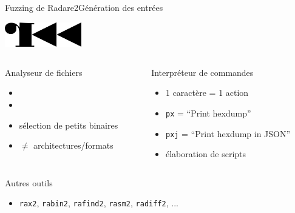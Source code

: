 \begin{frame}[fragile]{Fuzzing de Radare2}{Génération des entrées}
  \begin{center}
    \includegraphics[width=0.25\textwidth, clip=true]{../medias/radare2-logo.png}
  \end{center}

  \begin{columns}[T]
    \begin{column}{0.44\linewidth}

      \begin{block}{Analyseur de fichiers}
        \begin{itemize}
        \item{}
        \item{}
        \item{sélection de petits binaires}
        \item{$\ne$ architectures/formats}
        \end{itemize}

        \vspace{1.10ex}
      \end{block}
    \end{column}

    \begin{column}{0.44\linewidth}
      \begin{block}{Interpréteur de commandes}
        \begin{itemize}
        \item{1 caractère = 1 action}
        \item{\lstinline{px} = ``Print hexdump''}
        \item{\lstinline{pxj} = ``Print hexdump in JSON''}
        \item{élaboration de scripts}
        \end{itemize}
      \end{block}
    \end{column}
  \end{columns}
  \pause
  \vfill
  \begin{exampleblock}{Autres outils}
    \begin{itemize}
    \item{\lstinline{rax2}, \lstinline{rabin2}, \lstinline{rafind2}, \lstinline{rasm2}, \lstinline{radiff2}, ...}
    \end{itemize}
  \end{exampleblock}
\end{frame}

